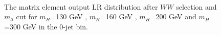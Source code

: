 \documentclass{cmspaper}
\begin{document}
\begin{figure}[!hbtp]
\\                                              
\caption{The matrix element output LR distribution after $WW$ selection and $m_{ll}$ cut                      
for $m_H$=130 GeV , $m_H$=160 GeV , $m_H$=200 GeV 
 and $m_H$=300 GeV  in the 0-jet bin.}                                            
\label{fig:lrstacks}                                                                                          
\end{figure}                      
\end{document}
